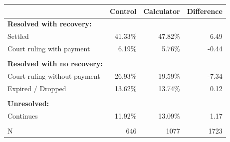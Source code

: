 \begin{tabular}{l|rrr}
\toprule
      & \multicolumn{1}{l}{Control} & \multicolumn{1}{l}{Calculator} & \multicolumn{1}{l}{Difference} \\
\midrule
\textbf{Resolved with recovery: } &       &       &  \\
Settled & 41.33\% & 47.82\% & 6.49 \\
Court ruling with payment & 6.19\% & 5.76\% & -0.44 \\
      &       &       &  \\
\textbf{Resolved with no recovery: } &       &       &  \\
Court ruling without payment & 26.93\% & 19.59\% & -7.34 \\
Expired / Dropped & 13.62\% & 13.74\% & 0.12 \\
      &       &       &  \\
\textbf{Unresolved: } &       &       &  \\
Continues & 11.92\% & 13.09\% & 1.17 \\
      &       &       &  \\
N     & 646   & 1077  & 1723 \\
\bottomrule
\bottomrule
\end{tabular}%
